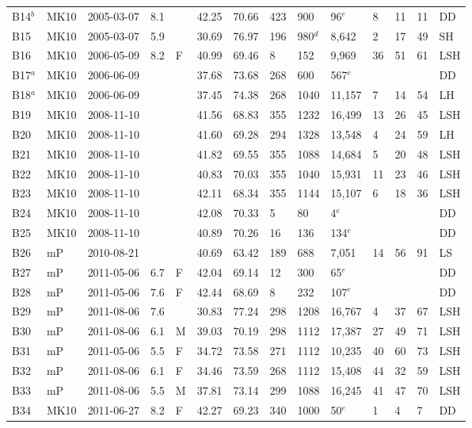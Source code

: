 \begin{table}[t!]
\begin{tabular}{p{.75cm} p{.85cm} p{1.5cm} p{.5cm} p{.5cm} p{.75cm} p{.75cm} p{.5cm} p{.75cm} p{.75cm} p{.5cm} p{.5cm} p{.5cm} p{.5cm}}
B14$^b$ & MK10 & 2005-03-07 & 8.1 &  & 42.25 & 70.66 & 423 & 900 & 96$^e$ & 8 & 11 & 11 & DD\\
B15 & MK10 & 2005-03-07 & 5.9 &  & 30.69 & 76.97 & 196 & 980$^d$ & 8,642 & 2 & 17 & 49 & SH\\
B16 & MK10 & 2006-05-09 & 8.2 & F & 40.99 & 69.46 & 8 & 152 & 9,969 & 36 & 51 & 61 & LSH\\
B17$^a$ & MK10 & 2006-06-09 &  &  & 37.68 & 73.68 & 268 & 600 & 567$^e$ &  &  &  & DD\\
B18$^a$ & MK10 & 2006-06-09 &  &  & 37.45 & 74.38 & 268 & 1040 & 11,157 & 7 & 14 & 54 & LH\\
B19 & MK10 & 2008-11-10 &  &  & 41.56 & 68.83 & 355 & 1232 & 16,499 & 13 & 26 & 45 & LSH\\
B20 & MK10 & 2008-11-10 &  &  & 41.60 & 69.28 & 294 & 1328 & 13,548 & 4 & 24 & 59 & LH\\
B21 & MK10 & 2008-11-10 &  &  & 41.82 & 69.55 & 355 & 1088 & 14,684 & 5 & 20 & 48 & LSH\\
B22 & MK10 & 2008-11-10 &  &  & 40.83 & 70.03 & 355 & 1040 & 15,931 & 11 & 23 & 46 & LSH\\
B23 & MK10 & 2008-11-10 &  &  & 42.11 & 68.34 & 355 & 1144 & 15,107 & 6 & 18 & 36 & LSH\\
B24 & MK10 & 2008-11-10 &  &  & 42.08 & 70.33 & 5 & 80 & 4$^e$ &  &  &  & DD\\
B25 & MK10 & 2008-11-10 &  &  & 40.89 & 70.26 & 16 & 136 & 134$^e$ &  &  &  & DD\\
B26 & mP & 2010-08-21 &  &  & 40.69 & 63.42 & 189 & 688 & 7,051 & 14 & 56 & 91 & LS\\
B27 & mP & 2011-05-06 & 6.7 & F & 42.04 & 69.14 & 12 & 300 & 65$^e$ &  &  &  & DD\\
B28 & mP & 2011-05-06 & 7.6 & F & 42.44 & 68.69 & 8 & 232 & 107$^e$ &  &  &  & DD\\
B29 & mP & 2011-08-06 & 7.6 &  & 30.83 & 77.24 & 298 & 1208 & 16,767 & 4 & 37 & 67 & LSH\\
B30 & mP & 2011-08-06 & 6.1 & M & 39.03 & 70.19 & 298 & 1112 & 17,387 & 27 & 49 & 71 & LSH\\
B31 & mP & 2011-05-06 & 5.5 & F & 34.72 & 73.58 & 271 & 1112 & 10,235 & 40 & 60 & 73 & LSH\\
B32 & mP & 2011-08-06 & 6.1 & F & 34.46 & 73.59 & 268 & 1112 & 15,408 & 44 & 32 & 59 & LSH\\
B33 & mP & 2011-08-06 & 5.5 & M & 37.81 & 73.14 & 299 & 1088 & 16,245 & 41 & 47 & 70 & LSH\\
B34 & MK10 & 2011-06-27 & 8.2 & F & 42.27 & 69.23 & 340 & 1000 & 50$^e$ & 1 & 4 & 7 & DD\\

\end{tabular}
\end{table}
